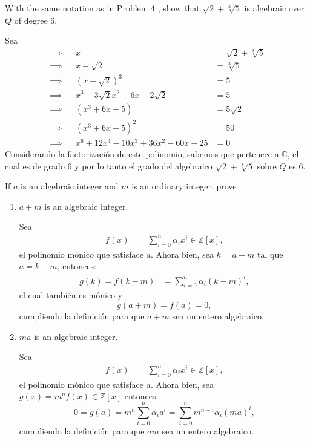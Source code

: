 \begin{problema}[Problema 5]
    With the same notation as in Problem 4 , show that $\sqrt{2}+\sqrt[3]{5}$ is algebraic over $Q$ of degree 6.
    \begin{dem}
        Sea 
        \begin{align*}
            \implies& &x &= \sqrt{2}+\sqrt[3]{5}\\
            \implies& &x-\sqrt{2} &= \sqrt[3]{5}\\
            \implies& &(x-\sqrt{2})^3 &= 5\\
            \implies& &x^3-3\sqrt{2}x^2+6x-2\sqrt{2} &= 5\\
            \implies& &  (x^3+6x-5) &= 5\sqrt{2}\\
            \implies& &  (x^3+6x-5)^2 &= 50\\
            \implies& &  x^6+12x^4-10x^3+36x^2-60x-25&= 0
        \end{align*}
        Considerando la factorización de este polinomio, sabemos que pertenece a $\mathbb{C}$, el cual es de grado 6 y por lo tanto el grado  del algebraico $\sqrt{2}+\sqrt[3]{5}$ sobre $Q$ es 6. 
    \end{dem}
\end{problema}

\begin{problema}[Problema 12]
    If $a$ is an algebraic integer and $m$ is an ordinary integer, prove
    \begin{enumerate}
        \item $a+m$ is an algebraic integer.
        \begin{dem}
            Sea 
            \begin{align*}
                f(x) &= \sum_{i=0}^n\alpha_ix^i\in \mathbb{Z}[x],
            \end{align*}
            el polinomio mónico que satisface $a$. Ahora bien, sea $k=a+m$ tal que $a=k-m$, entonces:
            \begin{align*}
                g(k) = f(k-m) &= \sum_{i=0}^n\alpha_i(k-m)^i,
            \end{align*}
            el cual también es mónico y 
            $$g(a+m)=f(a)=0,$$
            cumpliendo la definición para que $a+m$ sea un entero algebraico. 
        \end{dem}   
        \item $m a$ is an algebraic integer.
        \begin{dem}
            Sea 
            \begin{align*}
                f(x) &= \sum_{i=0}^n\alpha_ix^i\in \mathbb{Z}[x],
            \end{align*}
            el polinomio mónico que satisface $a$. Ahora bien, sea $g(x)=m^nf(x)\in\mathbb{Z}[x]$ entonces: 
            $$0=g(a)=m^n\sum_{i=0}^n\alpha_ia^i=\sum_{i=0}^n m^{n-i}\alpha_i(ma)^i,$$
            cumpliendo la definición para que $am$ sea un entero algebraico. 
        \end{dem}  
    \end{enumerate}
\end{problema}


%
%

